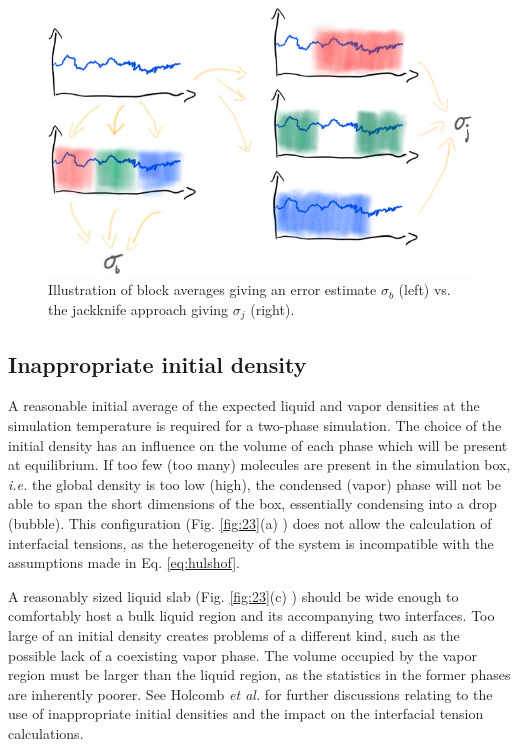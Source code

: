 \documentclass[9pt,bestpractices]{livecoms}
\begin{document}
\begin{figure}
	\centering
  \includegraphics[width=\linewidth]{gfx/fig_jackknife.jpeg}
  \caption{Illustration of block averages giving an error estimate $\sigma_b$ (left) vs. the jackknife approach giving $\sigma_j$ (right).}
\label{fig:jackknife}
\end{figure}


\subsection{Inappropriate initial density}
\label{sec:init-dens}
A reasonable initial average of the expected liquid and vapor densities at the
simulation temperature is required for a two-phase simulation. The choice of
the initial density has an influence on the volume of each phase which will be
present at equilibrium.  If too few (too many) molecules are present in the
simulation box, \textit{i.e.} the global density is too low (high), the condensed
(vapor) phase will not be able to span the short dimensions of the box,
essentially condensing into a drop (bubble). This configuration (Fig.
\ref{fig:23}(a) ) does not allow the calculation of interfacial tensions, as
the heterogeneity of the system is incompatible with the assumptions made in
Eq. \ref{eq:hulshof}.

A reasonably sized liquid slab (Fig. \ref{fig:23}(c) ) should be wide enough to comfortably host a bulk liquid
region and its accompanying two interfaces. Too large of an initial density
creates problems of a different kind, such as the possible lack of a coexisting
vapor phase. The volume occupied by the vapor region must be larger than the
liquid region, as the statistics in the former phases are inherently poorer.
See Holcomb \textit{et al.} \citep{holcomb1993} for further discussions relating
to the use of inappropriate initial densities and the impact on the interfacial tension
calculations.
\end{document}
